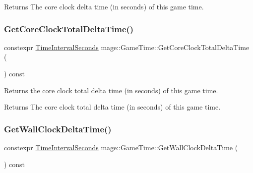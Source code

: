 \begin{DoxyReturn}{Returns}
The core clock delta time (in seconds) of this game time. 
\end{DoxyReturn}
\mbox{\label{classmage_1_1_game_time_a1f98b37bfd8b285df69d2dc1d00c851e}} 
\subsubsection{\texorpdfstring{Get\+Core\+Clock\+Total\+Delta\+Time()}{GetCoreClockTotalDeltaTime()}}
{\footnotesize\ttfamily constexpr \mbox{\hyperlink{namespacemage_a21c3d1575018d1e0720948713c76be1f}{Time\+Interval\+Seconds}} mage\+::\+Game\+Time\+::\+Get\+Core\+Clock\+Total\+Delta\+Time (\begin{DoxyParamCaption}{ }\end{DoxyParamCaption}) const\hspace{0.3cm}{\ttfamily [noexcept]}}

Returns the core clock total delta time (in seconds) of this game time.

\begin{DoxyReturn}{Returns}
The core clock total delta time (in seconds) of this game time. 
\end{DoxyReturn}
\mbox{\label{classmage_1_1_game_time_ae82a2db3b5f0e928407d27cd831629c5}} 
\subsubsection{\texorpdfstring{Get\+Wall\+Clock\+Delta\+Time()}{GetWallClockDeltaTime()}}
{\footnotesize\ttfamily constexpr \mbox{\hyperlink{namespacemage_a21c3d1575018d1e0720948713c76be1f}{Time\+Interval\+Seconds}} mage\+::\+Game\+Time\+::\+Get\+Wall\+Clock\+Delta\+Time (\begin{DoxyParamCaption}{ }\end{DoxyParamCaption}) const\hspace{0.3cm}{\ttfamily [noexcept]}}

